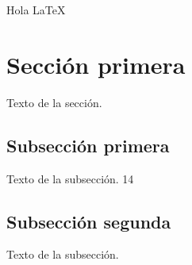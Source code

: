\documentclass{article}
\begin{document}
Hola \LaTeX


\section{Sección primera}
Texto de la sección.
\subsection{Subsección primera}
Texto de la subsección.
14
\subsection*{Subsección segunda}
Texto de la subsección.
\end{document}
